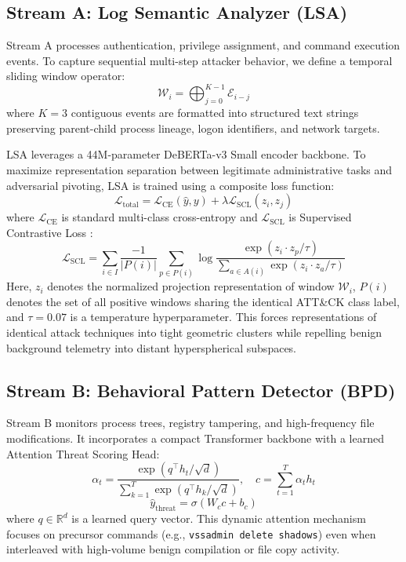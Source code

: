 \documentclass[10pt,journal,compsoc]{IEEEtran}
\begin{document}
\subsection{Stream A: Log Semantic Analyzer (LSA)}
Stream A processes authentication, privilege assignment, and command execution events. To capture sequential multi-step attacker behavior, we define a temporal sliding window operator:
\begin{equation}
    \mathcal{W}_i = \bigoplus_{j=0}^{K-1} \mathcal{E}_{i-j}
\end{equation}
where $K=3$ contiguous events are formatted into structured text strings preserving parent-child process lineage, logon identifiers, and network targets.

LSA leverages a 44M-parameter DeBERTa-v3 Small encoder backbone. To maximize representation separation between legitimate administrative tasks and adversarial pivoting, LSA is trained using a composite loss function:
\begin{equation}
    \mathcal{L}_{\text{total}} = \mathcal{L}_{\text{CE}}(\hat{y}, y) + \lambda \mathcal{L}_{\text{SCL}}(z_i, z_j)
\end{equation}
where $\mathcal{L}_{\text{CE}}$ is standard multi-class cross-entropy and $\mathcal{L}_{\text{SCL}}$ is Supervised Contrastive Loss \cite{khosla2020scl}:
\begin{equation}
    \mathcal{L}_{\text{SCL}} = \sum_{i \in I} \frac{-1}{|P(i)|} \sum_{p \in P(i)} \log \frac{\exp(z_i \cdot z_p / \tau)}{\sum_{a \in A(i)} \exp(z_i \cdot z_a / \tau)}
\end{equation}
Here, $z_i$ denotes the normalized projection representation of window $\mathcal{W}_i$, $P(i)$ denotes the set of all positive windows sharing the identical ATT\&CK class label, and $\tau = 0.07$ is a temperature hyperparameter. This forces representations of identical attack techniques into tight geometric clusters while repelling benign background telemetry into distant hyperspherical subspaces.

\subsection{Stream B: Behavioral Pattern Detector (BPD)}
Stream B monitors process trees, registry tampering, and high-frequency file modifications. It incorporates a compact Transformer backbone with a learned Attention Threat Scoring Head:
\begin{equation}
    \alpha_t = \frac{\exp(q^\top h_t / \sqrt{d})}{\sum_{k=1}^T \exp(q^\top h_k / \sqrt{d})}, \quad c = \sum_{t=1}^T \alpha_t h_t
\end{equation}
\begin{equation}
    \hat{y}_{\text{threat}} = \sigma(W_c c + b_c)
\end{equation}
where $q \in \mathbb{R}^d$ is a learned query vector. This dynamic attention mechanism focuses on precursor commands (e.g., \texttt{vssadmin delete shadows}) even when interleaved with high-volume benign compilation or file copy activity.
\end{document}
